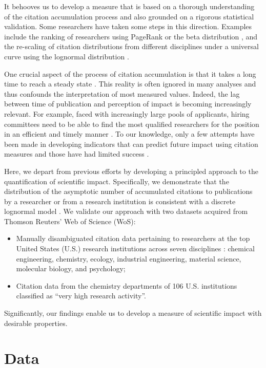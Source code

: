 It behooves us to develop a measure that is based on a thorough understanding of the citation accumulation process and also grounded on a rigorous statistical validation. Some researchers have taken some steps in this direction. Examples include the ranking of researchers using PageRank \cite{Radicchi2009} or the beta distribution \cite{Petersen2011}, and the re-scaling of citation distributions from different disciplines under a universal curve using the lognormal distribution \cite{Radicchi2008}.

One crucial aspect of the process of citation accumulation is that it takes a long time to reach a steady state \cite{Stringer2008}. This reality is often ignored in many analyses and thus confounds the interpretation of most measured values. Indeed, the lag between time of publication and perception of impact is becoming increasingly relevant. For example, faced with increasingly large pools of applicants, hiring committees need to be able to find the most qualified researchers for the position in an efficient and timely manner \cite{Lehmann2006, Abbott2010}. To our knowledge, only a few attempts have been made in developing indicators that can predict future impact using citation measures \cite{Acuna2012, Mazloumian2012} and those have had limited success \cite{Penner2013}.

Here, we depart from previous efforts by developing a principled approach to the quantification of scientific impact. Specifically, we demonstrate that the distribution of the asymptotic number of accumulated citations to publications by a researcher or from a research institution is consistent with a discrete lognormal model \cite{Stringer2008, Stringer2010}. We validate our approach with two datasets acquired from Thomson Reuters' Web of Science (WoS):
\begin{itemize}
\item Manually disambiguated citation data pertaining to researchers at the top United States (U.S.) research institutions across seven disciplines \cite{Duch2012}: chemical engineering, chemistry, ecology, industrial engineering, material science, molecular biology, and psychology;
\item Citation data from the chemistry departments of 106 U.S. institutions classified as ``very high research activity''.
\end{itemize}
Significantly, our findings enable us to develop a measure of scientific impact with desirable properties.


\section{Data}

